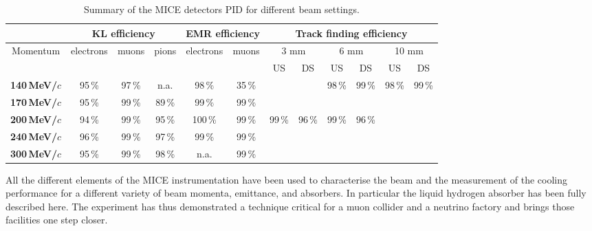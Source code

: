 \begin{table}[htb!]
	\caption{Summary of the MICE detectors PID for different beam settings.}
  \begin{center}
  \begin{tabular}{c|ccc|cc|cc|cc|cc}
  &
  \multicolumn{3}{c|}{\textbf{KL efficiency}} &
  \multicolumn{2}{c|}{\textbf{EMR efficiency}} &
  \multicolumn{6}{c}{\textbf{Track finding efficiency}} \\ 
  \hline
  \multirow{2}{*}{Momentum} &
  \multirow{2}{*}{electrons} &
  \multirow{2}{*}{muons} &
  \multirow{2}{*}{pions} &
  \multirow{2}{*}{electrons} &
  \multirow{2}{*}{muons} &
  \multicolumn{2}{c|}{3 mm} &
  \multicolumn{2}{c|}{6 mm} &
  \multicolumn{2}{c}{10 mm} \\  
             &      &      &      &       &      & US   & DS   & US   & DS   & US   & DS   \\ \hline
\textbf{140\,MeV/$c$} & 95\,\% & 97\,\% & n.a.   & 98\,\%  & 35\,\% &        &      & 98\,\%   & 99\,\% & 98\,\% & 99\,\% \\ \hline
\textbf{170\,MeV/$c$} & 95\,\% & 99\,\% & 89\,\% & 99\,\%  & 99\,\% &        &      &          &        &        &      \\ \hline
\textbf{200\,MeV/$c$} & 94\,\% & 99\,\% & 95\,\% & 100\,\% & 99\,\% & 99\,\% & 96\,\% & 99\,\% & 96\,\% &        &      \\ \hline
\textbf{240\,MeV/$c$} & 96\,\% & 99\,\% & 97\,\% & 99\,\%  & 99\,\% &        &      &          &        &        &      \\ \hline
\textbf{300\,MeV/$c$} & 95\,\% & 99\,\% & 98\,\% & n.a.    & 99\,\% &        &      &          &        &        &     
  \end{tabular}
	\label{tab:pid2}
  \end{center}
\end{table}
All the different elements of the MICE instrumentation have been used to characterise the beam and the measurement of the cooling performance for a different variety of beam momenta, emittance, and absorbers. In particular the liquid hydrogen absorber has been fully described here.
The experiment has thus demonstrated a technique critical for a muon collider and a neutrino factory and brings those facilities one step closer.


